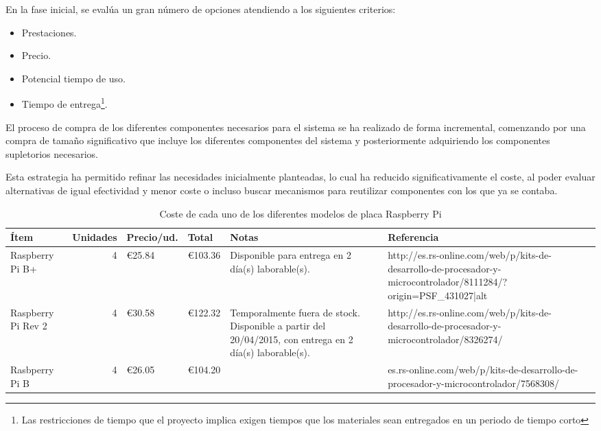 En la fase inicial, se evalúa un gran número de opciones atendiendo a los siguientes criterios:

\begin{itemize}
  \item Prestaciones.
  \item Precio.
  \item Potencial tiempo de uso.
  \item Tiempo de entrega\footnote{Las restricciones de tiempo que el proyecto implica exigen tiempos que los materiales sean entregados en un periodo de tiempo corto}.
\end{itemize}

\citationneeded[TODO]
El proceso de compra de los diferentes componentes necesarios para el sistema se ha realizado de forma incremental, comenzando por una compra de tamaño significativo que incluye los diferentes componentes del sistema y posteriormente adquiriendo los componentes supletorios necesarios.

Esta estrategia ha permitido refinar las necesidades inicialmente planteadas, lo cual ha reducido significativamente el coste, al poder evaluar alternativas de igual efectividad y menor coste o incluso buscar mecanismos para reutilizar componentes con los que ya se contaba.

\begin{landscape}
\begin{table}
\begin{tabular}{|l|r|l|l|p{4.5cm}|p{5cm}|}
\hline
Ítem&Unidades&Precio/ud.&Total&Notas&Referencia\\
\hline
Raspberry Pi B+&4&€25.84&€103.36&Disponible para entrega en 2 día(s) laborable(s).&http://es.rs-online.com/web/p/kits-de-desarrollo-de-procesador-y-microcontrolador/8111284/?origin=PSF\_431027|alt\\
\hline
Raspberry Pi Rev 2&4&€30.58&€122.32&Temporalmente fuera de stock. Disponible a partir del 20/04/2015, con entrega en 2 día(s) laborable(s).&http://es.rs-online.com/web/p/kits-de-desarrollo-de-procesador-y-microcontrolador/8326274/\\
\hline
Rasbperry Pi B&4&€26.05&€104.20&&es.rs-online.com/web/p/kits-de-desarrollo-de-procesador-y-microcontrolador/7568308/\\
\hline
\end{tabular}
\caption{Coste de cada uno de los diferentes modelos de placa Raspberry Pi}
\end{table}
\end{landscape}

